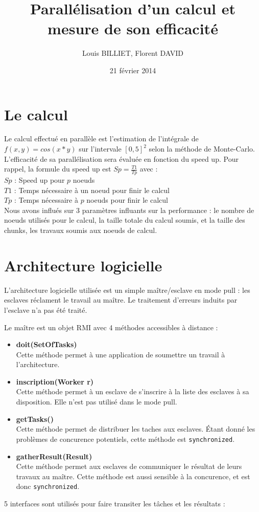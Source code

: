 \documentclass[oneside,10pt]{article}
\begin{document}
\title{Parall\'elisation d'un calcul et mesure de son efficacit\'e}
\author{Louis BILLIET, Florent DAVID}
\date{21 f\'evrier 2014}
\maketitle

\section{Le calcul}
Le calcul effectu\'e en parall\`ele est l'estimation de l'int\'egrale de $f(x,y)=cos(x*y)$ sur l'intervale $[0,5]^2$ selon la m\'ethode de Monte-Carlo.
L'efficacit\'e de sa parall\'elisation sera \'evalu\'ee en fonction du speed up.
Pour rappel, la formule du speed up est $Sp = \frac{T1}{Tp}$ avec : \\
$Sp$ : Speed up pour $p$ noeuds\\
$T1$ : Temps n\'ecessaire \`a un noeud pour finir le calcul\\
$Tp$ : Temps n\'ecessaire \`a $p$ noeuds pour finir le calcul\\


Nous avons influ\'es sur 3 param\`etres influants sur la performance : le nombre de noeuds utilis\'es pour le calcul, la taille totale du calcul soumis, et la taille des chunks, les travaux soumis aux noeuds de calcul.

\section{Architecture logicielle}
L'architecture logicielle utilis\'ee est un simple ma\^itre/esclave en mode pull : les esclaves r\'eclament le travail au ma\^itre.
Le traitement d'erreurs induits par l'esclave n'a pas \'et\'e trait\'e.


Le ma\^itre est un objet RMI avec 4 m\'ethodes accessibles \`a distance :
\begin{itemize}
\item \textbf{doit(SetOfTasks)}\\
Cette m\'ethode permet \`a une application de soumettre un travail \`a l'architecture.
\item \textbf{inscription(Worker r)}\\
Cette m\'ethode permet \`a un esclave de s'inscrire \`a la liste des esclaves \`a sa disposition.
Elle n'est pas utilis\'e dans le mode pull.
\item \textbf{getTasks()}\\
Cette m\'ethode permet de distribuer les taches aux esclaves.
\'Etant donn\'e les probl\`emes de concurence potentiels, cette m\'ethode est \verb+synchronized+.
\item \textbf{gatherResult(Result)}\\
Cette m\'ethode permet aux esclaves de communiquer le r\'esultat de leurs travaux au ma\^itre.
Cette m\'ethode est aussi sensible \`a la concurence, et est donc \verb+synchronized+.
\end{itemize}
5 interfaces sont utilis\'es pour faire transiter les t\^aches et les r\'esultats :
\end{document}
